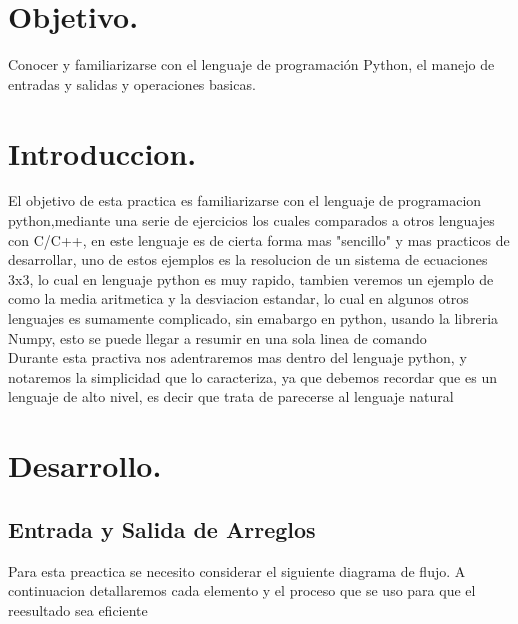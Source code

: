 \documentclass[12pt]{article}
\begin{document}
\newpage																		

\tableofcontents 

\newpage

\section{Objetivo.}

Conocer y familiarizarse con el lenguaje de programación Python, el manejo de entradas y salidas y operaciones basicas.


\section{Introduccion.} 
El objetivo de esta practica es familiarizarse con el lenguaje de programacion python,mediante una serie de ejercicios los cuales comparados a otros lenguajes con C/C++, en este lenguaje es de cierta forma mas "sencillo"  y mas practicos de desarrollar, uno de estos ejemplos es la resolucion de un sistema de ecuaciones 3x3, lo cual en lenguaje python es  muy rapido, tambien veremos un ejemplo de como la media aritmetica y la desviacion estandar, lo cual en algunos otros lenguajes es sumamente complicado, sin emabargo en python, usando la libreria Numpy, esto se puede llegar a resumir en una sola linea de comando\\
Durante esta practiva nos adentraremos mas dentro del lenguaje python, y notaremos la simplicidad que lo caracteriza, ya que debemos recordar que es un lenguaje de alto nivel, es decir que trata de parecerse al lenguaje natural
\section{Desarrollo.}

\subsection{Entrada y Salida de Arreglos}
Para esta preactica se necesito considerar el siguiente diagrama de flujo. A continuacion detallaremos cada elemento y el proceso que se uso para que el reesultado sea eficiente
\end{document}
